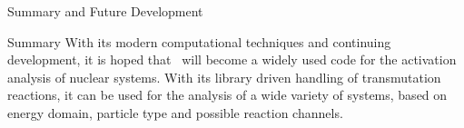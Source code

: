 \begin{chapter}{Summary and Future Development}
\begin{section}{Summary}
    With its modern computational techniques and continuing
    development, it is hoped that \ALARA\  will become a widely used
    code for the activation analysis of nuclear systems.  With its
    library driven handling of transmutation reactions, it can be used
    for the analysis of a wide variety of systems, based on energy
    domain, particle type and possible reaction channels.

  \end{section}

\end{chapter}